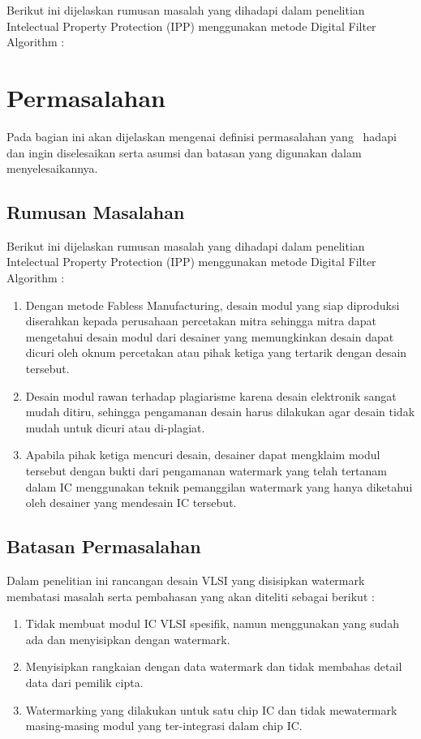 Berikut ini dijelaskan rumusan masalah yang dihadapi dalam penelitian Intelectual Property Protection (IPP) menggunakan metode Digital Filter Algorithm :

\section{Permasalahan}
Pada bagian ini akan dijelaskan mengenai definisi permasalahan yang \saya~hadapi dan ingin diselesaikan serta asumsi dan batasan yang digunakan dalam menyelesaikannya.

\subsection{Rumusan Masalahan}
Berikut ini dijelaskan rumusan masalah yang dihadapi dalam penelitian Intelectual Property Protection (IPP) menggunakan metode Digital Filter Algorithm :

\begin{enumerate}
	\item Dengan metode Fabless Manufacturing, desain modul yang siap diproduksi diserahkan kepada perusahaan percetakan mitra sehingga mitra dapat mengetahui desain modul dari desainer yang	memungkinkan desain dapat dicuri oleh oknum percetakan atau pihak	ketiga yang tertarik dengan desain tersebut.
	
	\item Desain modul rawan terhadap plagiarisme karena desain elektronik sangat mudah ditiru, sehingga pengamanan desain harus dilakukan agar desain tidak mudah untuk dicuri atau di-plagiat.
	
	\item Apabila pihak ketiga mencuri desain, desainer dapat mengklaim modul tersebut dengan bukti dari pengamanan watermark yang telah tertanam dalam IC menggunakan teknik pemanggilan watermark yang hanya diketahui oleh desainer yang mendesain IC tersebut.
\end{enumerate}

\subsection{Batasan Permasalahan}
Dalam penelitian ini rancangan desain VLSI yang disisipkan watermark membatasi masalah serta pembahasan yang akan diteliti sebagai berikut :

\begin{enumerate}
	\item Tidak membuat modul IC VLSI spesifik, namun menggunakan yang sudah ada dan menyisipkan dengan watermark.
	
	\item Menyisipkan rangkaian dengan data watermark dan tidak membahas detail data dari pemilik cipta.
	
	\item Watermarking yang dilakukan untuk satu chip IC dan tidak mewatermark masing-masing modul yang ter-integrasi dalam chip IC. 
\end{enumerate}

